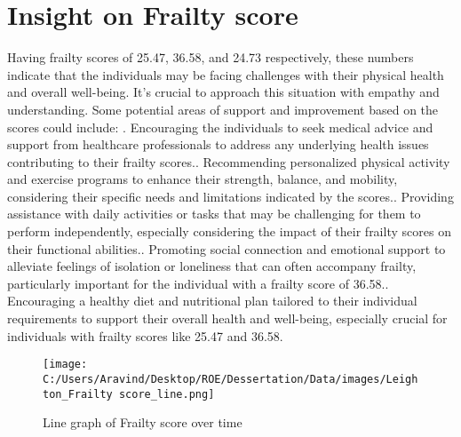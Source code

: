 \documentclass[10pt, a4paper]{article}%
\begin{document}
%
\section{Insight on Frailty score}%
\label{sec:InsightonFrailtyscore}%
Having frailty scores of 25.47, 36.58, and 24.73 respectively, these numbers indicate that the individuals may be facing challenges with their physical health and overall well{-}being. It’s crucial to approach this situation with empathy and understanding.\newline%
\newline%
Some potential areas of support and improvement based on the scores could include:\newline%
. Encouraging the individuals to seek medical advice and support from healthcare professionals to address any underlying health issues contributing to their frailty scores.. Recommending personalized physical activity and exercise programs to enhance their strength, balance, and mobility, considering their specific needs and limitations indicated by the scores.. Providing assistance with daily activities or tasks that may be challenging for them to perform independently, especially considering the impact of their frailty scores on their functional abilities.. Promoting social connection and emotional support to alleviate feelings of isolation or loneliness that can often accompany frailty, particularly important for the individual with a frailty score of 36.58.. Encouraging a healthy diet and nutritional plan tailored to their individual requirements to support their overall health and well{-}being, especially crucial for individuals with frailty scores like 25.47 and 36.58.%


\begin{figure}[H]%
\centering%
\texttt{[image: C:/Users/Aravind/Desktop/ROE/Dessertation/Data/images/Leighton\_Frailty score\_line.png]}%
\caption{Line graph of Frailty score over time}%
\end{figure}

%
\end{document}

